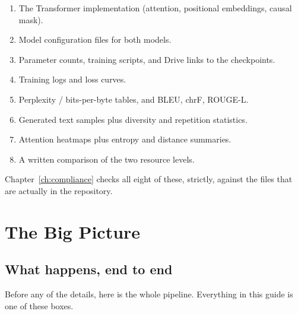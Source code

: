 \documentclass[11pt]{report}
\begin{document}
\begin{enumerate}[leftmargin=*]
\item The Transformer implementation (attention, positional embeddings, causal mask).
\item Model configuration files for both models.
\item Parameter counts, training scripts, and Drive links to the checkpoints.
\item Training logs and loss curves.
\item Perplexity / bits-per-byte tables, and BLEU, chrF, ROUGE-L.
\item Generated text samples plus diversity and repetition statistics.
\item Attention heatmaps plus entropy and distance summaries.
\item A written comparison of the two resource levels.
\end{enumerate}

Chapter~\ref{ch:compliance} checks all eight of these, strictly, against the
files that are actually in the repository.

\chapter{The Big Picture}

\section{What happens, end to end}

Before any of the details, here is the whole pipeline. Everything in this guide
is one of these boxes.
\end{document}
